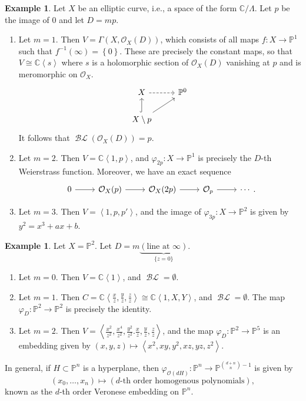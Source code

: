 \documentclass[10pt,letterpaper,cm]{nupset}
\theoremstyle{definition}
\newtheorem{exmp}[defn]{Example}
\theoremstyle{theorem}
\theoremstyle{remark}
\newcommand{\C}{\mathbb C}
\renewcommand{\O}{\mathcal O}
\renewcommand{\P}{\mathbb P}
\newcommand{\1}{\mathbb{1}}
\newcommand{\0}{\vec 0}
\DeclareMathOperator{\BL}{\mathcal{BL}}
\newcommand{\be}{\begin{enumerate}}
\newcommand{\ee}{\end{enumerate}}
\begin{document}
\begin{exmp}
Let $X$ be an elliptic curve, i.e., a space of the form $\C/\Lambda$. Let $p$ be the image of $0$ and let $D = mp$. 
\be
\item Let $m =1$. Then $V = \Gamma\left(X, \O_X(D)\right)$, which consists of all maps $f: X \to \P^1$ such that $f^{-1}\left(\infty\right) = \left\{0\right\}$. These are precisely the constant maps, so that $V \cong \C\left\langle s\right\rangle$ where $s$ is a holomorphic section of $\O_X(D)$ vanishing at $p$ and is meromorphic on $\O_X$.
\[
\begin{tikzcd}
X \arrow[r, dashed]                     & \P^0 \\
X\setminus p \arrow[u, hook] \arrow[ru] &     
\end{tikzcd}
\]
It follows that  $\BL\left(\O_X(D)\right) =p$.
\item Let $m=2$. Then $V= \C\left\langle 1, p\right\rangle$, and $\varphi_{2p} : X \to \P^1$ is precisely the $D$-th Weierstrass function. Moreover, we have an exact sequence
\[
\begin{tikzcd}
0 \arrow[r] & \O_X(p) \arrow[r] & \O_X(2p) \arrow[r] & \O_p \arrow[r] & \cdots
\end{tikzcd}.
\]
\item Let $m=3$. Then $V = \left\langle 1, p, p'\right\rangle$, and the image of $\varphi_{3p} :X \to \P^2$ is given by $y^2 = x^3+ax+b$. 
\ee
\end{exmp}

\begin{exmp} Let $X = \P^2$. Let $D= m\underbrace{\left(\text{line at }\infty\right)}_{\{z=0\}}$.
\be
\item Let $m=0$. Then $V = \C\left\langle 1\right\rangle$, and $\BL= \emptyset$.
\item Let $m=1$. Then $C = \C\left\langle \frac{x}{z}, \frac{y}{z}, \frac{z}{z}\right\rangle \cong \C\left\langle 1, X, Y\right\rangle$, and $\BL = \emptyset$. The map $\varphi_D : \P^2 \to \P^2$ is precisely the identity. 
\item Let $m=2$. Then $V = \left\langle \frac{x^2}{z^2}, \frac{x^4}{z^2}, \frac{y^2}{z^2}. \frac{x}{z}, \frac{y}{z}, \frac{z}{z}\right\rangle$, and the map $\varphi_D : \P^2 \to \P^5$ is an embedding given by $\left(x,y,z\right) \mapsto \left\langle x^2, xy, y^2, xz, yz, z^2\right\rangle$.
\ee
\end{exmp}

In general, if $H\subset \P^n$ is a hyperplane, then $\varphi_{\O\left(d{H}\right)} : \P^n \to \P^{{{d+n}\choose n} -1}$ is given by $$\left(x_0, \ldots, x_n\right) \mapsto \left(d\text{-th order homogenous polynomials}\right),$$  known as the $d$-th order Veronese embedding on $\P^n$.
\end{document}
